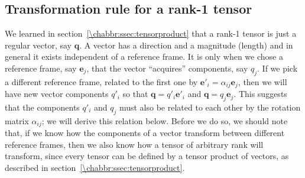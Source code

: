 \subsection{Transformation rule for a rank-1 tensor}
We learned in section~\ref{\chabbr:ssec:tensorproduct} that a rank-1 tensor is just a regular vector, say $\mathbf{q}$.  A vector has a direction and a magnitude (length) and in general it exists independent of a reference frame.  It is only when we chose a reference frame, say $\mathbf{e}_j$, that the vector ``acquires'' components, say $q_j$. If we pick a different reference frame, related to the first one by $\mathbf{e}'_i = \alpha_{ij}\mathbf{e}_j$, then we will have new vector components $q'_i$ so that $\mathbf{q}=q'_i \mathbf{e}'_i$ and $\mathbf{q}=q_j \mathbf{e}_j$. This suggests that the components $q'_i$ and $q_j$ must also be related to each other by the rotation matrix $\alpha_{ij}$; we will derive this relation below. Before we do so, we should note that, if we know how the components of a vector transform between different reference frames, then we also know how a tensor of arbitrary rank will transform, since every tensor can be defined by a tensor product of vectors, as described in section~\ref{\chabbr:ssec:tensorproduct}.


